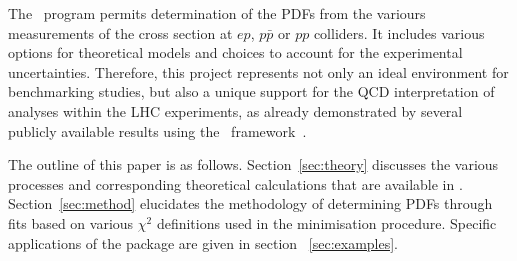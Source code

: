 
The \fitter\ program permits determination of the PDFs from the variours measurements of the cross section at $ep$, $p\bar{p}$ or $pp$ colliders.  
 It includes various options for theoretical models and choices to account for the experimental uncertainties. Therefore, this project represents not only an ideal environment for benchmarking studies, but also a unique support for the QCD interpretation of analyses within the LHC experiments,
as already demonstrated by several publicly available results using the \fitter\ 
framework~\cite{strange, jets, hm}.  

The outline of this paper is as follows.
%
Section~\ref{sec:theory} discusses the various processes 
and corresponding theoretical calculations 
that are available in \fitter.
%
Section~\ref{sec:method} elucidates the 
methodology of determining PDFs through fits based on various
 $\chi^2$ definitions used in the
minimisation procedure.
%
Specific applications of the package are given in
section ~\ref{sec:examples}. 
%
